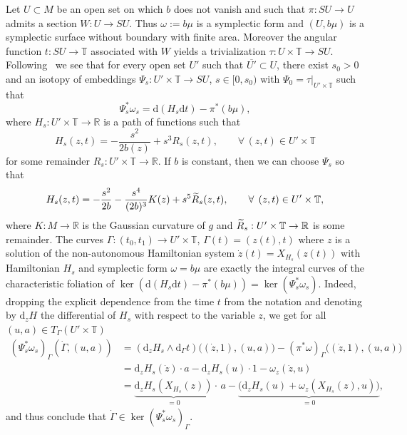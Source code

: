 \documentclass[AHL,Unicode,longabstracts,published]{cedram}
\newcommand{\R}{\mathbb{R}}
\newcommand{\T}{\mathbb{T}}
\newcommand{\diff}{\mathrm{d}}
\let\oldtilde\tilde
\renewcommand*{\tilde}[1]{\mathchoice{\widetilde{#1}}{\widetilde{#1}}{\oldtilde{#1}}{\oldtilde{#1}}}
\let\oldforall\forall
\renewcommand*{\forall}{\mathrel{\oldforall}}
\begin{document}
Let $U\subset M$ be an open set on which $b$ does not vanish and such that $\pi:SU\to U$ admits a section $W:U\to SU$. Thus $\omega:=b\mu$ is a symplectic form and $(U,b\mu)$ is a symplectic surface without boundary with finite area. Moreover the angular function $t:SU\to \T$ associated with $W$ yields a trivialization $\tau:U\times \T\to SU$. Following~\cite[Theorem~1.1]{AB21} we see that for every open set $U'$ such that $\overline{U'}\subset U$, there exist $s_0>0$ and an isotopy of embeddings $\Psi_s:U'\times\T\to SU$, $s\in[0,s_0)$ with $\Psi_0=\tau|_{U'\times\T}$ such that
\[
\Psi_s^*\omega_s=\diff\left(H_s\diff t\right)-\pi^*(b\mu),
\]
where $H_s:U'\times\T\to\R$ is a path of functions such that
\begin{equation}\label{e:H1}
H_s(z,t)=-\frac{s^2}{2b(z)}+s^3R_s(z,t),\qquad \forall\,(z,t)\in U'\times\T
\end{equation}
for some remainder $R_s:U'\times\T\to \R$. If $b$ is constant, then we can choose $\Psi_s$ so that
\begin{equation}\label{e:H2}
H_s(z,t)=-\frac{s^2}{2b}-\frac{s^4}{(2b)^3}K(z)+s^5\tilde R_s(z,t),\qquad\forall\,(z,t)\in U'\times\T,
\end{equation}
where $K:M\to\R$ is the Gaussian curvature of $g$ and $\tilde R_s:U'\times\T\to\R$ is some remainder. The curves $\Gamma:(t_0,t_1)\to U'\times\T$, $\Gamma(t)=(z(t),t)$ where $z$ is a solution of the non-autonomous Hamiltonian system $\dot z(t)=X_{H_s}(z(t))$ with Hamiltonian $H_s$ and symplectic form $\omega=b\mu$ are exactly the integral curves of the characteristic foliation of $\ker(\diff(H_s\diff t)-\pi^*(b\mu))=\ker(\Psi_s^*\omega_s)$. Indeed, dropping the explicit dependence from the time $t$ from the notation and denoting by $\diff_z H$ the differential of $H_s$ with respect to the variable $z$, we get for all $(u,a)\in T_\Gamma (U'\times\T)$
\begin{align*}
\left(\Psi_s^* \omega_s\right)_{\Gamma} \left(\dot \Gamma,(u,a)\right) &= \left(\diff_z H_s \wedge \diff_\Gamma t\right)\big((\dot z,1),(u,a)\big) - \left(\pi^*\omega\right)_{\Gamma}\big((\dot z,1),(u,a)\big)\\
&= \diff_z H_s (\dot z) \cdot a-\diff_z H_s (u)\cdot 1 - \omega_z(\dot z,u)\\
&=\underbrace{\diff_z H_s\left(X_{H_s}(z)\right)}_{=0} \cdot\,a - \underbrace{ \big(\diff_z H_s (u) + \omega_z\left(X_{H_s}(z),u\right)\big) }_{=0},
\end{align*}
and thus conclude that $\dot \Gamma \in \ker (\Psi^*_s\omega_s)_{\Gamma}$.
\end{document}
